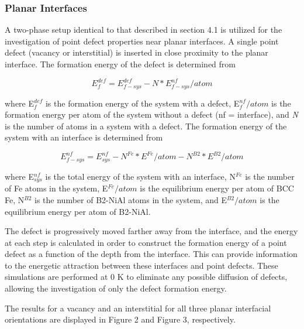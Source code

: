 \documentclass[review]{elsarticle}
\begin{document}
\subsubsection{Planar Interfaces}
A two-phase setup identical to that described in section 4.1 is utilized for the investigation of point defect properties near planar interfaces.  A single point defect (vacancy or interstitial) is inserted in close proximity to the planar interface.  The formation energy of the defect is determined from

\begin{equation}
E_{f}^{def} = E_{f-sys}^{def} - N*E_{f-sys}^{nf}/atom
\end{equation}

where E$_{f}^{def}$ is the formation energy of the system with a defect, E$_{f}^{nf}/atom$ is the formation energy per atom of the system without a defect (nf = interface), and \textit{N} is the number of atoms in a system with a defect.  The formation energy of the system with an interface is determined from

\begin{equation}
E_{f-sys}^{nf} = E_{sys}^{nf} -  N^{Fe}*E^{Fe}/atom - N^{B2}*E^{B2}/atom
\end{equation}

where E$_{sys}^{nf}$ is the total energy of the system with an interface, N$^{Fe}$ is the number of Fe atoms in the system,  E$^{Fe}/atom$ is the equilibrium energy per atom of BCC Fe, N$^{B2}$ is the number of B2-NiAl atoms in the system, and E$^{B2}/atom$ is the equilibrium energy per atom of B2-NiAl.  

The defect is progressively moved farther away from the interface, and the energy at each step is calculated in order to construct the formation energy of a point defect as a function of the depth from the interface.  This can provide information to the energetic attraction between these interfaces and point defects.  These simulations are performed at 0 K to eliminate any possible diffusion of defects, allowing the investigation of only the defect formation energy.

The results for a vacancy and an interstitial for all three planar interfacial orientations are displayed in Figure 2 and Figure 3, respectively.
\end{document}
